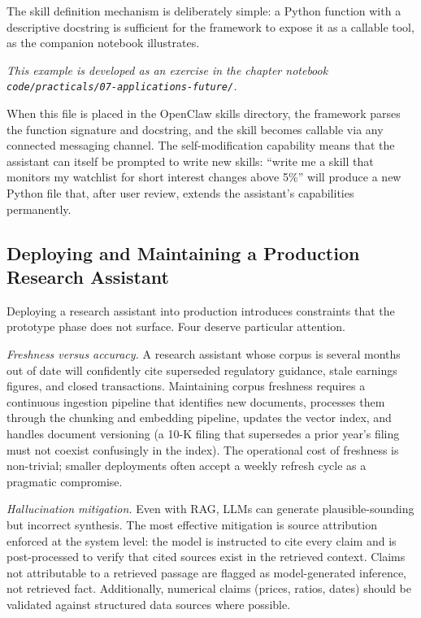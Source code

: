 \begin{context}
The skill definition mechanism is deliberately simple: a Python function with a descriptive docstring is sufficient for the framework to expose it as a callable tool, as the companion notebook illustrates.

\textit{This example is developed as an exercise in the chapter notebook \texttt{code/practicals/07-applications-future/}.}

When this file is placed in the OpenClaw skills directory, the framework parses the function signature and docstring, and the skill becomes callable via any connected messaging channel. The self-modification capability means that the assistant can itself be prompted to write new skills: ``write me a skill that monitors my watchlist for short interest changes above 5\%'' will produce a new Python file that, after user review, extends the assistant's capabilities permanently.

\subsection{Deploying and Maintaining a Production Research Assistant}
\label{subsec:af-ra-deployment}

Deploying a research assistant into production introduces constraints that the prototype phase does not surface. Four deserve particular attention.

\emph{Freshness versus accuracy.} A research assistant whose corpus is several months out of date will confidently cite superseded regulatory guidance, stale earnings figures, and closed transactions. Maintaining corpus freshness requires a continuous ingestion pipeline that identifies new documents, processes them through the chunking and embedding pipeline, updates the vector index, and handles document versioning (a 10-K filing that supersedes a prior year's filing must not coexist confusingly in the index). The operational cost of freshness is non-trivial; smaller deployments often accept a weekly refresh cycle as a pragmatic compromise.

\emph{Hallucination mitigation.} Even with RAG, LLMs can generate plausible-sounding but incorrect synthesis. The most effective mitigation is source attribution enforced at the system level: the model is instructed to cite every claim and is post-processed to verify that cited sources exist in the retrieved context. Claims not attributable to a retrieved passage are flagged as model-generated inference, not retrieved fact. Additionally, numerical claims (prices, ratios, dates) should be validated against structured data sources where possible.


\end{context}
